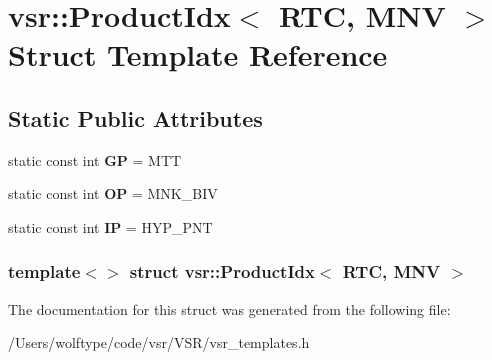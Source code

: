 \hypertarget{structvsr_1_1_product_idx_3_01_r_t_c_00_01_m_n_v_01_4}{\section{vsr\-:\-:Product\-Idx$<$ R\-T\-C, M\-N\-V $>$ Struct Template Reference}
\label{structvsr_1_1_product_idx_3_01_r_t_c_00_01_m_n_v_01_4}
}
\subsection*{Static Public Attributes}
\begin{DoxyCompactItemize}
\item 
\hypertarget{structvsr_1_1_product_idx_3_01_r_t_c_00_01_m_n_v_01_4_afc7636b6874f00ab41a3fcc45cd1c487}{static const int {\bfseries G\-P} = M\-T\-T}\label{structvsr_1_1_product_idx_3_01_r_t_c_00_01_m_n_v_01_4_afc7636b6874f00ab41a3fcc45cd1c487}

\item 
\hypertarget{structvsr_1_1_product_idx_3_01_r_t_c_00_01_m_n_v_01_4_af573cca4c4185395a76d58ef06ec52bf}{static const int {\bfseries O\-P} = M\-N\-K\-\_\-\-B\-I\-V}\label{structvsr_1_1_product_idx_3_01_r_t_c_00_01_m_n_v_01_4_af573cca4c4185395a76d58ef06ec52bf}

\item 
\hypertarget{structvsr_1_1_product_idx_3_01_r_t_c_00_01_m_n_v_01_4_a916b0abeb601aed6a40850a449f8fae2}{static const int {\bfseries I\-P} = H\-Y\-P\-\_\-\-P\-N\-T}\label{structvsr_1_1_product_idx_3_01_r_t_c_00_01_m_n_v_01_4_a916b0abeb601aed6a40850a449f8fae2}

\end{DoxyCompactItemize}
\subsubsection*{template$<$$>$ struct vsr\-::\-Product\-Idx$<$ R\-T\-C, M\-N\-V $>$}



The documentation for this struct was generated from the following file\-:\begin{DoxyCompactItemize}
\item 
/\-Users/wolftype/code/vsr/\-V\-S\-R/vsr\-\_\-templates.\-h\end{DoxyCompactItemize}
